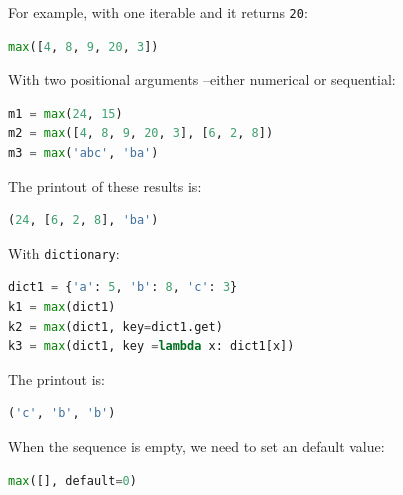 \documentclass[../main.tex]{subfiles}
\begin{document}
For example, with one iterable and it returns \texttt{20}:
\begin{lstlisting}[language=Python]
max([4, 8, 9, 20, 3])
\end{lstlisting}
With two positional arguments --either numerical or sequential:
\begin{lstlisting}[language=Python]
m1 = max(24, 15)
m2 = max([4, 8, 9, 20, 3], [6, 2, 8])
m3 = max('abc', 'ba')
\end{lstlisting}
The printout of these results is:
\begin{lstlisting}[language=Python]
(24, [6, 2, 8], 'ba')
\end{lstlisting}
With \texttt{dictionary}:
\begin{lstlisting}[language=Python]
dict1 = {'a': 5, 'b': 8, 'c': 3}
k1 = max(dict1)
k2 = max(dict1, key=dict1.get)
k3 = max(dict1, key =lambda x: dict1[x])
\end{lstlisting}
The printout is:
\begin{lstlisting}[language=Python]
('c', 'b', 'b')
\end{lstlisting}
When the sequence is empty, we need to set an default value:
\begin{lstlisting}[language=Python]
max([], default=0)
\end{lstlisting}
\end{document}
